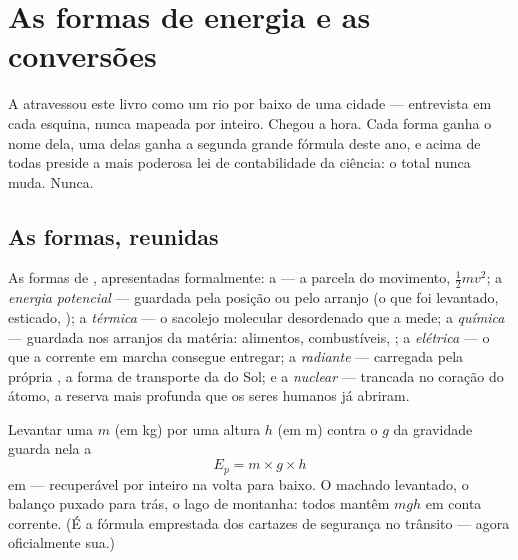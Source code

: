 \chapter{As formas de energia e as conversões}\label{ch:g9:energy-conversions}

A  atravessou este livro como um rio por baixo de uma cidade
--- entrevista em cada esquina, nunca mapeada por inteiro. Chegou a
hora. Cada forma ganha o nome dela, uma delas ganha a segunda grande
fórmula deste ano, e acima de todas preside a mais poderosa lei de
contabilidade da ciência: o total nunca muda. Nunca.

\section{As formas, reunidas}

\begin{definition}\label{def:g9:energy-conversions:forms}
As formas de , apresentadas formalmente: a \emph{} --- a parcela do movimento, $\frac12 m v^2$; a \emph{energia
potencial} --- guardada pela posição ou pelo
arranjo (o que foi levantado, esticado, ); a \emph{
térmica} --- o sacolejo molecular desordenado que a  mede;
a \emph{ química} --- guardada nos arranjos da matéria:
alimentos, combustíveis, ; a \emph{ elétrica} --- o que
a corrente em marcha consegue entregar; a \emph{ radiante} ---
carregada pela própria , a forma de transporte da  do Sol; e a
\emph{ nuclear} --- trancada no coração do átomo, a reserva
mais profunda que os seres humanos já abriram.
\end{definition}

\begin{proposition}\label{prop:g9:energy-conversions:ep}
Levantar uma  $m$ (em \unit{kg}) por uma altura $h$ (em
\unit{m}) contra o $g$ da gravidade guarda nela a 
\[
E_p = m \times g \times h
\]
em  --- recuperável por inteiro na volta para baixo. O machado
levantado, o balanço puxado para trás, o lago de montanha: todos
mantêm $m g h$ em conta corrente. (É a fórmula emprestada dos
cartazes de segurança no trânsito --- agora oficialmente sua.)
\end{proposition}

